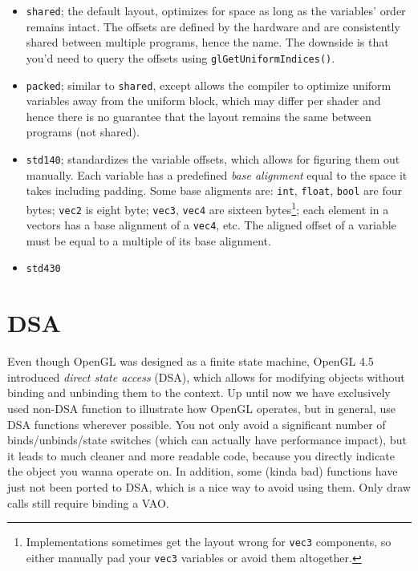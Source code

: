 \documentclass[table, xcdraw]{article}%
\begin{document}
\begin{itemize}
    \item \texttt{shared}; the default layout, optimizes for space as long as the variables' order remains intact. The offsets are defined by the hardware and are consistently shared between multiple programs, hence the name. The downside is that you'd need to query the offsets using \texttt{glGetUniformIndices()}.
    \item \texttt{packed}; similar to \texttt{shared}, except allows the compiler to optimize uniform variables away from the uniform block, which may differ per shader and hence there is no guarantee that the layout remains the same between programs (not shared).
    \item \texttt{std140}; standardizes the variable offsets, which allows for figuring them out manually. Each variable has a predefined \emph{base alignment} equal to the space it takes including padding. Some base aligments are: \texttt{int}, \texttt{float}, \texttt{bool} are four bytes; \texttt{vec2} is eight byte; \texttt{vec3}, \texttt{vec4} are sixteen bytes\footnote{Implementations sometimes get the layout wrong for \texttt{vec3} components, so either manually pad your \texttt{vec3} variables or avoid them altogether.}; each element in a vectors has a base alignment of a \texttt{vec4}, etc. The aligned offset of a variable must be equal to a multiple of its base alignment.
    \item \texttt{std430}
\end{itemize}

\section{DSA} \label{DSA}

Even though OpenGL was designed as a finite state machine, OpenGL 4.5 introduced \emph{direct state access} (DSA), which allows for modifying objects without binding and unbinding them to the context. Up until now we have exclusively used non-DSA function to illustrate how OpenGL operates, but in general, use DSA functions wherever possible. You not only avoid a significant number of binds/unbinds/state switches (which can actually have performance impact), but it leads to much cleaner and more readable code, because you directly indicate the object you wanna operate on. In addition, some (kinda bad) functions have just not been ported to DSA, which is a nice way to avoid using them. Only draw calls still require binding a VAO.
\end{document}
